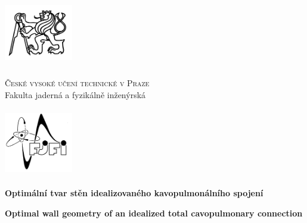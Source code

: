 \def\documentdate{21. kv\v{e}tna 2023}


\pagestyle{empty}
{\centering

\noindent %
\begin{minipage}[c]{3cm}%
\noindent \begin{center}
\includegraphics[width=3cm,height=3cm,keepaspectratio]{figures/TITLE/cvut}
\par\end{center}%
\end{minipage}%
\begin{minipage}[c]{0.6\linewidth}%
\begin{center}
\textsc{\large{}České vysoké učení technické v Praze}{\large{}}\\
{\large{}Fakulta jaderná a fyzikálně inženýrská}
\par\end{center}%
\end{minipage}%
\begin{minipage}[c]{3cm}%
\noindent \begin{center}
\includegraphics[width=3cm,height=3cm,keepaspectratio]{figures/TITLE/fjfi}
\par\end{center}%
\end{minipage}

\vspace{3cm}

\textbf{\huge{}Optimální tvar stěn idealizovaného kavopulmonálního spojení}{\huge\par}

\vspace{1cm}

%
\textbf{\huge{}Optimal wall geometry of an idealized total cavopulmonary connection}{\huge\par}

}
